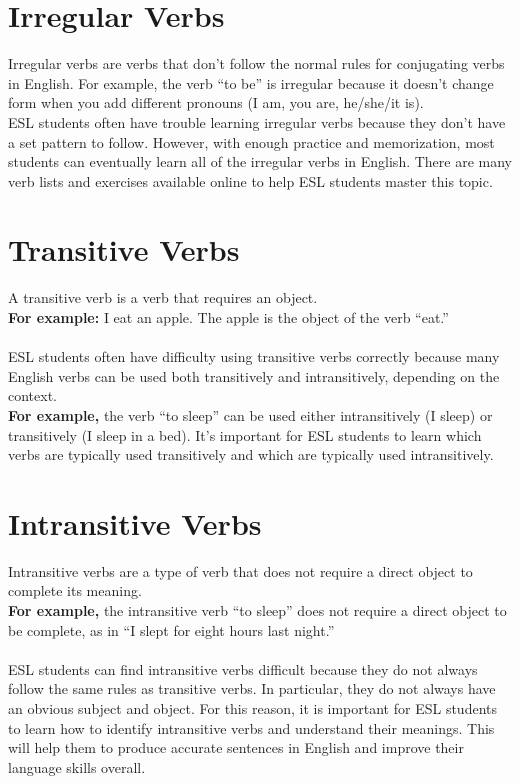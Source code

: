 \section{Irregular Verbs}
Irregular verbs are verbs that don’t follow the normal rules for conjugating verbs in English. For example, the verb “to be” is irregular because it doesn’t change form when you add different pronouns (I am, you are, he/she/it is).\\
ESL students often have trouble learning irregular verbs because they don’t have a set pattern to follow. However, with enough practice and memorization, most students can eventually learn all of the irregular verbs in English. There are many verb lists and exercises available online to help ESL students master this topic.


\newpage
\section{Transitive Verbs}
A transitive verb is a verb that requires an object.\\ 
\textbf{For example:} I eat an apple. The apple is the object of the verb “eat.”\\\\
ESL students often have difficulty using transitive verbs correctly because many English verbs can be used both transitively and intransitively, depending on the context.\\
\textbf{For example,} the verb “to sleep” can be used either intransitively (I sleep) or transitively (I sleep in a bed). It’s important for ESL students to learn which verbs are typically used transitively and which are typically used intransitively.

\section{Intransitive Verbs}
Intransitive verbs are a type of verb that does not require a direct object to complete its meaning.\\
\textbf{For example,} the intransitive verb “to sleep” does not require a direct object to be complete, as in “I slept for eight hours last night.”\\\\
ESL students can find intransitive verbs difficult because they do not always follow the same rules as transitive verbs. In particular, they do not always have an obvious subject and object. For this reason, it is important for ESL students to learn how to identify intransitive verbs and understand their meanings. This will help them to produce accurate sentences in English and improve their language skills overall.

